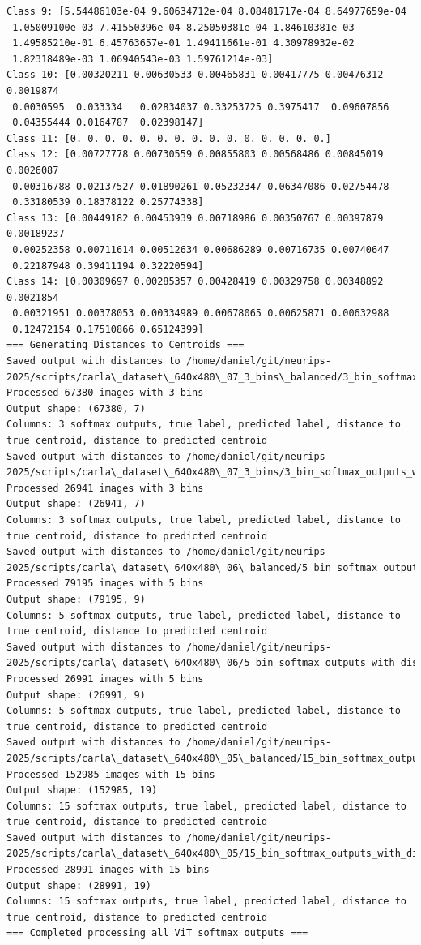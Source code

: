 \begin{verbatim}
Class 9: [5.54486103e-04 9.60634712e-04 8.08481717e-04 8.64977659e-04
 1.05009100e-03 7.41550396e-04 8.25050381e-04 1.84610381e-03
 1.49585210e-01 6.45763657e-01 1.49411661e-01 4.30978932e-02
 1.82318489e-03 1.06940543e-03 1.59761214e-03]
Class 10: [0.00320211 0.00630533 0.00465831 0.00417775 0.00476312 0.0019874
 0.0030595  0.033334   0.02834037 0.33253725 0.3975417  0.09607856
 0.04355444 0.0164787  0.02398147]
Class 11: [0. 0. 0. 0. 0. 0. 0. 0. 0. 0. 0. 0. 0. 0. 0.]
Class 12: [0.00727778 0.00730559 0.00855803 0.00568486 0.00845019 0.0026087
 0.00316788 0.02137527 0.01890261 0.05232347 0.06347086 0.02754478
 0.33180539 0.18378122 0.25774338]
Class 13: [0.00449182 0.00453939 0.00718986 0.00350767 0.00397879 0.00189237
 0.00252358 0.00711614 0.00512634 0.00686289 0.00716735 0.00740647
 0.22187948 0.39411194 0.32220594]
Class 14: [0.00309697 0.00285357 0.00428419 0.00329758 0.00348892 0.0021854
 0.00321951 0.00378053 0.00334989 0.00678065 0.00625871 0.00632988
 0.12472154 0.17510866 0.65124399]
=== Generating Distances to Centroids ===
Saved output with distances to /home/daniel/git/neurips-2025/scripts/carla\_dataset\_640x480\_07_3_bins\_balanced/3_bin_softmax_outputs_with_distances\_balanced.npy
Processed 67380 images with 3 bins
Output shape: (67380, 7)
Columns: 3 softmax outputs, true label, predicted label, distance to true centroid, distance to predicted centroid
Saved output with distances to /home/daniel/git/neurips-2025/scripts/carla\_dataset\_640x480\_07_3_bins/3_bin_softmax_outputs_with_distances_unbalanced.npy
Processed 26941 images with 3 bins
Output shape: (26941, 7)
Columns: 3 softmax outputs, true label, predicted label, distance to true centroid, distance to predicted centroid
Saved output with distances to /home/daniel/git/neurips-2025/scripts/carla\_dataset\_640x480\_06\_balanced/5_bin_softmax_outputs_with_distances\_balanced.npy
Processed 79195 images with 5 bins
Output shape: (79195, 9)
Columns: 5 softmax outputs, true label, predicted label, distance to true centroid, distance to predicted centroid
Saved output with distances to /home/daniel/git/neurips-2025/scripts/carla\_dataset\_640x480\_06/5_bin_softmax_outputs_with_distances_unbalanced.npy
Processed 26991 images with 5 bins
Output shape: (26991, 9)
Columns: 5 softmax outputs, true label, predicted label, distance to true centroid, distance to predicted centroid
Saved output with distances to /home/daniel/git/neurips-2025/scripts/carla\_dataset\_640x480\_05\_balanced/15_bin_softmax_outputs_with_distances\_balanced.npy
Processed 152985 images with 15 bins
Output shape: (152985, 19)
Columns: 15 softmax outputs, true label, predicted label, distance to true centroid, distance to predicted centroid
Saved output with distances to /home/daniel/git/neurips-2025/scripts/carla\_dataset\_640x480\_05/15_bin_softmax_outputs_with_distances_unbalanced.npy
Processed 28991 images with 15 bins
Output shape: (28991, 19)
Columns: 15 softmax outputs, true label, predicted label, distance to true centroid, distance to predicted centroid
=== Completed processing all ViT softmax outputs ===


\end{verbatim}
